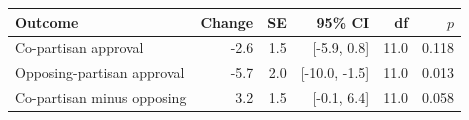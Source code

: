\begin{tabular}{lrrrrr}
\toprule
Outcome & Change & SE & 95\% CI & df & $p$ \\
\midrule
Co-partisan approval & -2.6 & 1.5 & [-5.9, 0.8] & 11.0 & 0.118 \\
Opposing-partisan approval & -5.7 & 2.0 & [-10.0, -1.5] & 11.0 & 0.013 \\
Co-partisan minus opposing & 3.2 & 1.5 & [-0.1, 6.4] & 11.0 & 0.058 \\
\bottomrule
\end{tabular}
